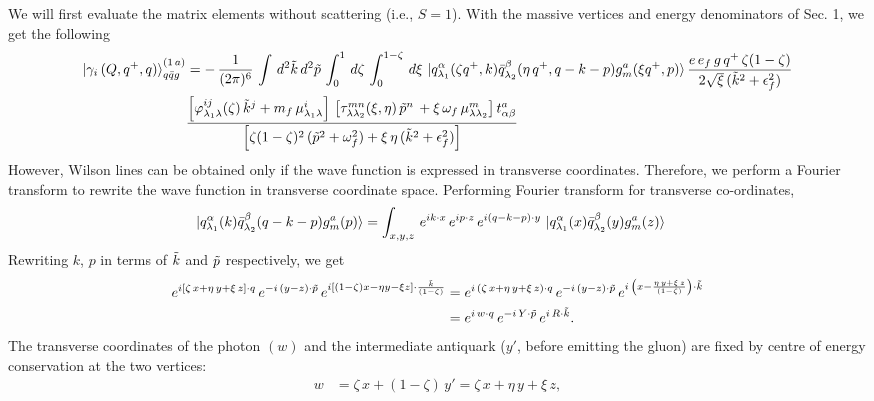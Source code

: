 \documentclass[9pt]{article}
\numberwithin{equation}{section}
\begin{document}
\begin{enumerate}
We will first evaluate the matrix elements without scattering (i.e., $S = 1$). With the massive vertices and energy denominators of Sec. 1, we get the following
\begin{align}
    \ket{\gamma_{i}\,(Q,q^{+},q)}^{(1\,a)}_{q\Bar{q}g} & = -\,\frac{1}{(2\pi)^{6}}\, \int\, d^{2}\Tilde{k}\, d^{2}\Tilde{p}\, \int_{0}^{1}\, d\zeta\, \int_{0}^{1-\zeta}\, d\xi\,\ket{q^{\alpha}_{\lambda_{1}}(\zeta q^{+},k)\Bar{q}^{\beta}_{\lambda_{2}}(\eta\,q^{+},q-k-p)g^{a}_{m}(\xi q^{+},p)} \frac{e\,e_{f}\,g\,q^{+}\,\zeta(1-\zeta)}{2\sqrt{\xi}\,(\Tilde{k}^{2}+\epsilon^{2}_{f})}\notag \\ & \frac{\left[\varphi^{ij}_{\lambda_{1}\lambda}(\zeta)\, \Tilde{k}^{j}+m_{f}\,\mu^{i}_{\lambda_{1}\lambda}\right]\,\left[\tau^{mn}_{\lambda \lambda_{2}}(\xi,\eta)\, \Tilde{p}^{n}\,+ \xi\, \omega_{f}\,\mu^{m}_{\lambda\lambda_{2}}\right] t^{a}_{\alpha\beta}}{\left[\zeta(1-\zeta)^{2}\, (\Tilde{p}^{2} +\omega^{2}_{f}) +\xi\,\eta\,(\Tilde{k}^{2}+\epsilon_{f}^{2})\right]}
\end{align} 
However, Wilson lines can be obtained only if the wave function is expressed in transverse coordinates. Therefore, we perform a Fourier transform to rewrite the wave function in transverse coordinate space. Performing Fourier transform for transverse co-ordinates,
\begin{align}
   \ket{q^{\alpha}_{\lambda_{1}}(k)\Bar{q}^{\beta}_{\lambda_{2}}(q-k-p)g^{a}_{m}(p)} & = \int_{x,y,z}\, e^{ik\cdot x}\, e^{ip\cdot z}\, e^{i(q-k-p)\cdot y}\,\ket{q^{\alpha}_{\lambda_{1}}(x)\Bar{q}^{\beta}_{\lambda_{2}}(y)g^{a}_{m}(z)}
\end{align}
Rewriting $k$, $p$ in terms of $\Tilde{k}$ and $\Tilde{p}$ respectively, we get
\begin{align}
    e^{i\left[\zeta\,x +\eta\, y + \xi\,z\right]\cdot q}\,e^{-i\,(y-z)\cdot \Tilde{p}}\, e^{i\left[(1-\zeta)x-\eta y-\xi z\right]\cdot \frac{\Tilde{k}}{(1-\zeta)}} & = e^{i\,\left(\zeta\,x+\eta\,y + \xi\,z\right)\cdot q}\,e^{-i\,(y-z)\cdot \Tilde{p}}\, e^{i\,\left(x-\frac{\eta\,y + \xi\,z}{(1-\zeta)}\right)\cdot \Tilde{k}} \notag \\ & = e^{i\,w\cdot q}\, e^{-i\,Y\cdot \Tilde{p}}\, e^{i\,R\cdot \Tilde{k}}.
\end{align}
The transverse coordinates of the photon $(w)$ and the intermediate antiquark ($y'$, before emitting the gluon) are fixed by centre of energy conservation at the two vertices:
\begin{align}
    w & = \zeta\,x +(1-\zeta)\,y' = \zeta\,x + \eta\,y + \xi\,z,

\end{align}
\end{enumerate}
\end{document}
